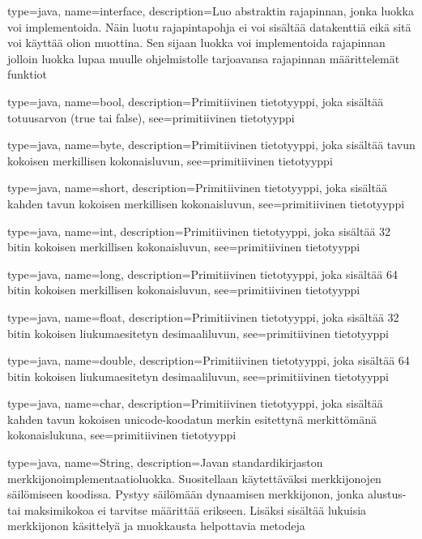 {
    type=java,
    name=interface,
    description={Luo abstraktin rajapinnan, jonka luokka voi implementoida. Näin luotu
rajapintapohja ei voi sisältää datakenttiä eikä sitä voi käyttää olion muottina. Sen sijaan luokka
voi implementoida rajapinnan jolloin luokka lupaa muulle ohjelmistolle tarjoavansa rajapinnan
määrittelemät funktiot}
}

{
    type=java,
    name=bool,
    description={Primitiivinen tietotyyppi, joka sisältää totuusarvon (true tai false)},
    see={primitiivinen tietotyyppi}
}

{
    type=java,
    name=byte,
    description={Primitiivinen tietotyyppi, joka sisältää tavun kokoisen merkillisen
kokonaisluvun},
    see={primitiivinen tietotyyppi}
}

{
    type=java,
    name=short,
    description={Primitiivinen tietotyyppi, joka sisältää kahden tavun kokoisen merkillisen
kokonaisluvun},
    see={primitiivinen tietotyyppi}
}

{
    type=java,
    name=int,
    description={Primitiivinen tietotyyppi, joka sisältää 32 bitin kokoisen merkillisen
kokonaisluvun},
    see={primitiivinen tietotyyppi}
}

{
    type=java,
    name=long,
    description={Primitiivinen tietotyyppi, joka sisältää 64 bitin kokoisen merkillisen
kokonaisluvun},
    see={primitiivinen tietotyyppi}
}

{
    type=java,
    name=float,
    description={Primitiivinen tietotyyppi, joka sisältää 32 bitin kokoisen liukumaesitetyn
desimaaliluvun},
    see={primitiivinen tietotyyppi}
}

{
    type=java,
    name=double,
    description={Primitiivinen tietotyyppi, joka sisältää 64 bitin kokoisen liukumaesitetyn
desimaaliluvun},
    see={primitiivinen tietotyyppi}
}

{
    type=java,
    name=char,
    description={Primitiivinen tietotyyppi, joka sisältää kahden tavun kokoisen unicode-koodatun
merkin esitettynä merkittömänä kokonaislukuna},
    see={primitiivinen tietotyyppi}
}

{
    type=java,
    name=String,
    description={Javan standardikirjaston merkkijonoimplementaatioluokka. Suositellaan
käytettäväksi merkkijonojen säilömiseen koodissa. Pystyy säilömään dynaamisen merkkijonon, jonka
alustus- tai maksimikokoa ei tarvitse määrittää erikseen. Lisäksi sisältää lukuisia merkkijonon
käsittelyä ja muokkausta helpottavia metodeja}
}

